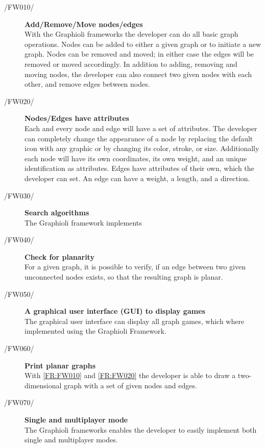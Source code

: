 \begin{description}
  	\item[/FW010/\label{FR:FW010}] {\bf Add/Remove/Move nodes/edges}  \hfill \\
	With the Graphioli frameworks the developer can do all basic graph operations. Nodes can be added to either a given graph or to initiate a new graph. Nodes can be removed and moved; in either case the edges will be removed or moved accordingly. In addition to adding, removing and moving nodes, the developer can also connect two given nodes with each other, and remove edges between nodes.
	\item[/FW020/\label{FR:FW020}] {\bf Nodes/Edges have attributes}  \\
	Each and every node and edge will have a set of attributes. The developer can completely change the appearance of a node by replacing the default icon with any graphic or by changing its color, stroke, or size. Additionally each node will have its own coordinates, its own weight, and an unique identification as attributes. Edges have attributes of their own, which the developer can set. An edge can have a weight, a length, and a direction.
	\item[/FW030/\label{FR:FW030}] {\bf Search algorithms}  \\
	The Graphioli framework implements 
	\item[/FW040/\label{FR:FW040}] {\bf  Check for planarity}  \\
	For a given graph, it is possible to verify, if an edge between two given unconnected nodes exists, so that the resulting graph is planar.
 	\item[/FW050/\label{FR:FW050}] {\bf A graphical user interface (GUI) to display games}  \\
 	The graphical user interface  can display all graph games, which where implemented using the Graphioli Framework.
	\item[/FW060/\label{FR:FW060}] {\bf Print planar graphs}  \\
  	With \ref{FR:FW010} and \ref{FR:FW020} the developer is able to draw a two-dimensional graph with a set of given nodes and edges.
	\item[/FW070/\label{FR:FW070}] {\bf Single and multiplayer mode}  \\
	The Graphioli frameworks enables the developer to easily implement both single and multiplayer modes.
	

\end{description}
